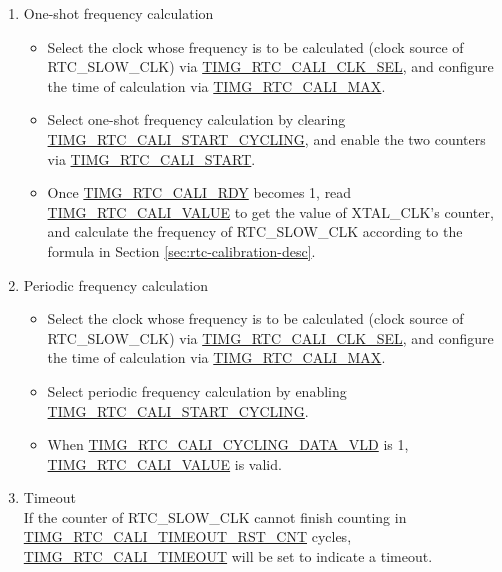 \documentclass[main\_\_EN.tex]{subfiles}
\begin{document}
\begin{enumerate}
    \item One-shot frequency calculation
    \begin{itemize}
        \item Select the clock whose frequency is to be calculated (clock source of RTC\_SLOW\_CLK) via \hyperref[fielddesc:TIMGRTCCALICLKSEL]{TIMG\_RTC\_CALI\_CLK\_SEL}, and configure the time of calculation via \hyperref[fielddesc:TIMGRTCCALIMAX]{TIMG\_RTC\_CALI\_MAX}.
        \item Select one-shot frequency calculation by clearing \hyperref[fielddesc:TIMGRTCCALISTARTCYCLING]{TIMG\_RTC\_CALI\_START\_CYCLING}, and enable the two counters via \hyperref[fielddesc:TIMGRTCCALISTART]{TIMG\_RTC\_CALI\_START}.
        \item Once \hyperref[fielddesc:TIMGRTCCALIRDY]{TIMG\_RTC\_CALI\_RDY} becomes 1, read \hyperref[fielddesc:TIMGRTCCALIVALUE]{TIMG\_RTC\_CALI\_VALUE} to get the value of XTAL\_CLK's counter, and calculate the frequency of RTC\_SLOW\_CLK according to the formula in Section \ref{sec:rtc-calibration-desc}.
    \end{itemize}
    \item Periodic frequency calculation
    \begin{itemize}
        \item Select the clock whose frequency is to be calculated (clock source of RTC\_SLOW\_CLK) via \hyperref[fielddesc:TIMGRTCCALICLKSEL]{TIMG\_RTC\_CALI\_CLK\_SEL}, and configure the time of calculation via \hyperref[fielddesc:TIMGRTCCALIMAX]{TIMG\_RTC\_CALI\_MAX}.
        \item Select periodic frequency calculation by enabling \hyperref[fielddesc:TIMGRTCCALISTARTCYCLING]{TIMG\_RTC\_CALI\_START\_CYCLING}.
        \item When \hyperref[fielddesc:TIMGRTCCALICYCLINGDATAVLD]{TIMG\_RTC\_CALI\_CYCLING\_DATA\_VLD} is 1, \hyperref[fielddesc:TIMGRTCCALIVALUE]{TIMG\_RTC\_CALI\_VALUE} is valid.
    \end{itemize}
    \item Timeout\\
    If the counter of RTC\_SLOW\_CLK cannot finish counting in \hyperref[fielddesc:TIMGRTCCALITIMEOUTRSTCNT]{TIMG\_RTC\_CALI\_TIMEOUT\_RST\_CNT} cycles,  \\\hyperref[fielddesc:TIMGRTCCALITIMEOUT]{TIMG\_RTC\_CALI\_TIMEOUT} will be set to indicate a timeout.
\end{enumerate}
\end{document}
